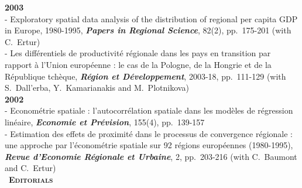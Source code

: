 \documentclass[a4paper,12pt]{article}
\newcommand{\smalltitre}[1]{%
	\noindent \textbullet~\textsc{\textbf{#1}}
	\smallskip
	}
\begin{document}
\noindent \textbf{2003}  \smallskip \\ 
- Exploratory spatial data analysis of the distribution of regional per capita GDP in Europe, 1980-1995, \textit{\textbf{Papers in Regional Science}}, 82(2), pp.~175-201 (with C.~Ertur) \\
- Les différentiels de productivité régionale dans les pays en transition par rapport à l'Union européenne : le cas de la Pologne, de la Hongrie et de la République tchèque, \textit{\textbf{Région et Développement}}, 2003-18, pp.~111-129 (with S.~Dall'erba, Y.~Kamarianakis and M.~Plotnikova) \\

\noindent \textbf{2002}  \smallskip \\ 
- Econométrie spatiale : l'autocorrélation spatiale dans les modèles de régression linéaire, \textit{\textbf{Economie et Prévision}}, 155(4), pp.~139-157 \\
- Estimation des effets de proximité dans le processus de convergence régionale : une approche par l'économétrie spatiale sur 92 régions européennes (1980-1995), \textit{\textbf{Revue d'Economie Régionale et Urbaine}}, 2, pp.~203-216 (with C.~Baumont and C.~Ertur) \\


\smalltitre{Editorials}\medskip
\end{document}
